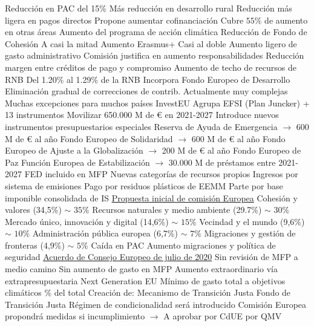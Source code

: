 \documentclass{nuevotema}
\begin{document}
\begin{esquemal}
				\4 Reducción en PAC del 15\%
				\4[] Más reducción en desarrollo rural
				\4[] Reducción más ligera en pagos directos
				\4[] Propone aumentar cofinanciación
				\4[] Cubre $55\%$ de aumento en otras áreas
				\4 Aumento del programa de acción climática
				\4 Reducción de Fondo de Cohesión
				\4[] A casi la mitad
				\4 Aumento Erasmus+
				\4[] Casi al doble
				\4 Aumento ligero de gasto administrativo
				\4[] Comisión justifica en aumento responsabilidades
				\4 Reducción margen entre créditos de pago y compromiso
				\4 Aumento de techo de recursos de RNB
				\4[] Del 1.20\% al 1.29\% de la RNB
				\4 Incorpora Fondo Europeo de Desarrollo
				\4 Eliminación gradual de correcciones de contrib.
				\4[] Actualmente muy complejas
				\4[] Muchas excepciones para muchos países
				\4 InvestEU
				\4[] Agrupa EFSI (Plan Juncker) + 13 instrumentos
				\4[] Movilizar 650.000 M de € en 2021-2027
				\4 Introduce nuevos instrumentos presupuestarios especiales
				\4[] Reserva de Ayuda de Emergencia
				\4[] $\to$ 600 M de € al año
				\4[] Fondo Europeo de Solidaridad
				\4[] $\to$ 600 M de € al año
				\4[] Fondo Europeo de Ajuste a la Globalización
				\4[] $\to$ 200 M de € al año
				\4[] Fondo Europeo de Paz
				\4[] Función Europea de Estabilización
				\4[] $\to$ 30.000 M de préstamos entre 2021-2027
				\4 FED incluido en MFP
				\4 Nuevas categorías de recursos propios
				\4[] Ingresos por sistema de emisiones
				\4[] Pago por residuos plásticos de EEMM
				\4[] Parte por base imponible consolidada de IS
				\4 \underline{Propuesta inicial de comisión Europea}
				\4[1] Cohesión y valores (34,5\%) $\sim$ $35\%$
				\4[2] Recursos naturales y medio ambiente (29.7\%) $\sim$ $30\%$
				\4[3] Mercado único, innovación y digital (14,6\%) $\sim$ $15\%$
				\4[4] Vecindad y el mundo (9,6\%) $\sim$ $10\%$
				\4[5] Administración pública europea (6,7\%) $\sim$ $7\%$
				\4[6] Migraciones y gestión de fronteras (4,9\%) $\sim$ $5\%$
				\4[$\then$] Caída en PAC
				\4[$\then$] Aumento migraciones y política de seguridad
			\3 \underline{Acuerdo de Consejo Europeo de julio de 2020}
				\4 Sin revisión de MFP a medio camino
				\4 Sin aumento de gasto en MFP
				\4 Aumento extraordinario vía extrapresupuestaria
				\4[] Next Generation EU
				\4 Mínimo de gasto total a objetivos climáticos
				\% del total
				\4 Creación de:
				\4[] Mecanismo de Transición Justa
				\4[] Fondo de Transición Justa
				\4 Régimen de condicionalidad será introducido
				\4[] Comisión Europea propondrá medidas si incumplimiento
				\4[] $\to$ A aprobar por CdUE por QMV

\end{esquemal}
\end{document}
